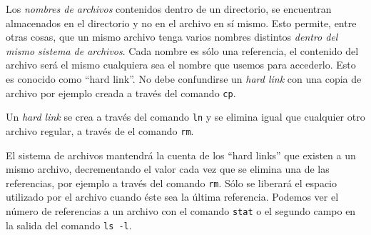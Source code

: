 \documentclass[12pt]{article}
\begin{document}
Los \textit{nombres de archivos} contenidos dentro de un directorio, se encuentran 
almacenados en el directorio y no en el archivo en sí mismo. Esto permite, entre otras
cosas, que un mismo archivo tenga varios nombres distintos \textit{dentro del mismo 
sistema de archivos}. Cada nombre es sólo una referencia, el contenido del archivo 
será el mismo cualquiera sea el nombre que usemos para accederlo. Esto es conocido
como ``hard link''. No debe confundirse un \textit{hard link} con una copia de archivo
por ejemplo creada a través del comando \texttt{cp}. 

Un \textit{hard link} se crea a  través del comando \texttt{ln} y se elimina igual 
que cualquier otro archivo regular, a través de el comando \texttt{rm}. 


El sistema de archivos mantendrá la cuenta de los ``hard links'' que existen 
a un mismo archivo, decrementando el valor cada vez que se elimina una de las 
referencias, por ejemplo a través del comando \texttt{rm}. Sólo se liberará el espacio 
utilizado por el archivo cuando éste sea la última referencia. Podemos ver el 
número de referencias a un archivo con el comando \texttt{stat} o el segundo campo 
en la salida del comando \texttt{ls -l}.  
\end{document}
